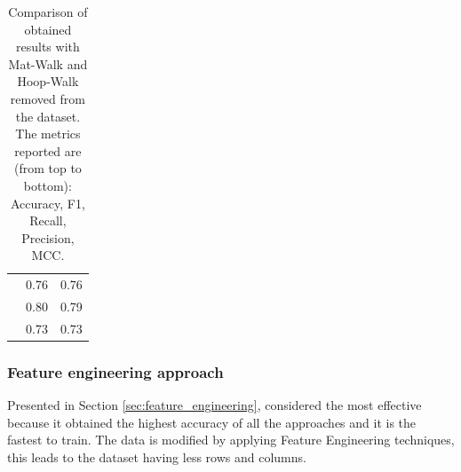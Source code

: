 \begin{table}[htbp]
\begin{tabular}{|c|c|c|}
                                                        & 0.76 & 0.76 \\
                                                        & 0.80 & 0.79 \\ 
                                                        & 0.73 & 0.73 \\ 
                                                        \hline
                    \end{tabular}
                    \caption{Comparison of obtained results with Mat-Walk and Hoop-Walk removed from the dataset. The metrics reported are (from top to bottom): Accuracy, F1, Recall, Precision, MCC.}
                    \label{tab:correct_approach_mat_hoop} 
                \end{table}
           \newpage 

            \subsubsection{Feature engineering approach}
                
                Presented in Section \ref{sec:feature_engineering}, considered the most effective because it obtained the highest accuracy of all the approaches and it is the fastest to train. The data is modified by applying Feature Engineering techniques, this leads to the dataset having less rows and columns.
            
